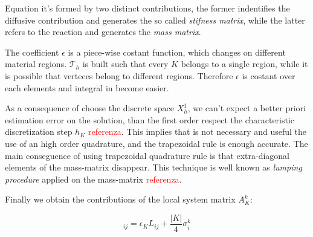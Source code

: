 Equation  it's formed by two distinct contributions, the former indentifies the diffusive contribution and generates the so called \textit{stifness matrix}, while the latter refers to the reaction and generates the \textit{mass matrix}.

The coefficient $\epsilon$ is a piece-wise costant function, which changes on different material regions. $\mathcal{T}_h$ is built such that every $K$ belongs to a single region, while it is possible that verteces belong to different regions. Therefore $\epsilon$ is costant over each elements and integral in  become easier.

As a consequence of choose the discrete space $X^1_{h}$,  we can't expect a better priori estimation error on the solution, than the first order respect the characteristic discretization step $h_K$ \textcolor{red}{referenza}. This implies that is not necessary and useful the use of an high order quadrature, and the trapezoidal rule is enough accurate. 
The main conseguence of using trapezoidal quadrature rule is that extra-diagonal elements of the mass-matrix disappear.
This technique is well known as \textit{lumping procedure} applied on the mass-matrix \textcolor{red}{referenza}.

%
%
%

Finally we obtain the contributions of the local system matrix $A_K^k$:

\begin{equation}
[A_K^k]_{ij}  = \epsilon_K
L_{ij}
+
\dfrac{|K|}{4} \sigma^k_i
\end{equation}

